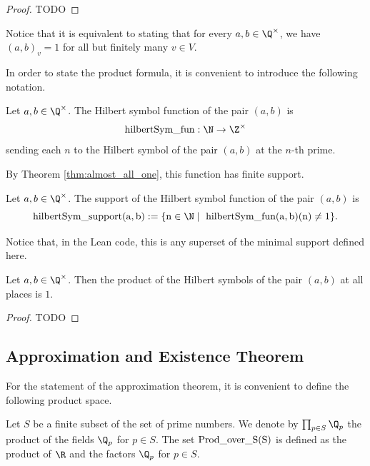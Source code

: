 \begin{proof}
	TODO
\end{proof}

Notice that it is equivalent to stating that for every $a, b \in \Q^\times$, we have $(a, b)_v = 1$
for all but finitely many $v \in V$.

In order to state the product formula, it is convenient to introduce the following notation.
\begin{definition}
	\label{def:hilbertSym_fun}
	\leanok
Let $a, b \in \Q^\times$. The Hilbert symbol function of the pair $(a,b)$ is
\[
\rm{hilbertSym\_fun}: \N \to \Z^\times
\]
sending each $n$ to the Hilbert symbol of the pair $(a,b)$ at the $n$-th prime.
\end{definition}

By Theorem \ref{thm:almost_all_one}, this function has finite support.

\begin{definition}
	\label{def:hilbertSym_support}
	\leanok
Let $a, b \in \Q^\times$. The support of the Hilbert symbol function of the pair $(a,b)$ is
\[
\rm{hilbertSym\_support}(a, b) := \{n \in \N \mid \ hilbertSym\_fun(a, b)(n) \neq 1\}.
\]
\end{definition}

Notice that, in the Lean code, this is any superset of the minimal support defined here.

\begin{theorem}
	\label{thm:product_formula}
	\leanok
Let $a, b \in \Q^\times$. Then the product of the Hilbert symbols of the pair $(a,b)$ at all places
is $1$.
\end{theorem}
\begin{proof}
	TODO
\end{proof}

\subsection{Approximation and Existence Theorem}


For the statement of the approximation theorem, it is convenient to define the following product
space.

\begin{definition}
	\label{def:prod_over_S}
	\leanok
Let $S$ be a finite subset of the set of prime numbers. We denote by $\prod_{p \in S} \Q_p$
the product of the fields $\Q_p$ for $p \in S$. The set $\rm{Prod\_over\_S} (S)$ is defined as the
product of $\R$ and the factors $\Q_p$ for $p \in S$.
\end{definition}

